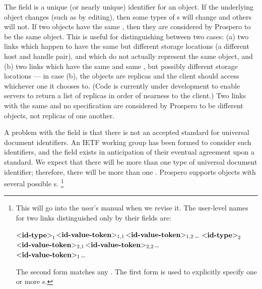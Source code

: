 The  field is a unique (or nearly unique)
identifier for an object.  If the underlying object changes (such as
by editing), then some types of s will change and
others will not.  If two
objects have the same , then they are considered by Prospero
to be the same object.  This is useful for distinguishing between two
cases: (a) two 
links which happen to have the same  but
different storage locations (a different host and handle pair), and which
do not actually represent the same object, and (b) two links which have the
same  and same , but possibly different storage
locations --- in case (b), the  objects are replicas and the client
should access whichever one it 
chooses to.  (Code is currently under development to enable
servers to return a list of replicas in order of nearness to
the client.)  Two links with the same  and no
 specification are considered by Prospero to be different
objects, not replicas of one another.

A problem with the  field is that there is not an accepted
standard for universal document identifiers.  An IETF working group has
been formed to consider such identifiers, and the 
field exists in anticipation of their eventual agreement upon a standard.
We expect that there will be more than one type of universal document
identifier; therefore, there will be more than one .
Prospero supports objects with several possible s.%
\footnote{This will go into the user's manual when we revise it.  The
  user-level names for two links distinguished only by their 
  fields are: 
  \begin{command}
	\ors{}\lit{\#}\lit{\#}\(\mbox{\meta{id-type}}_1\)\lit{\#}\(\mbox{\meta{id-value-token}}_{1,1}\)\lit{\#}\(\mbox{\meta{id-value-token}}_{1,2}\)\ldots %
	\lit{\#}\lit{\#}\(\mbox{\meta{id-type}}_2\)\lit{\#}\(\mbox{\meta{id-value-token}}_{2,1}\)\lit{\#}\(\mbox{\meta{id-value-token}}_{2,2}\)\ldots \\
  \metaor {}\lit{\#}\(\mbox{\meta{id-value-token}}_1\)\lit{\#}\ldots \ore
  \end{command}

The second form matches any .  The first form is used to
explicitly specify one or more s.

}

